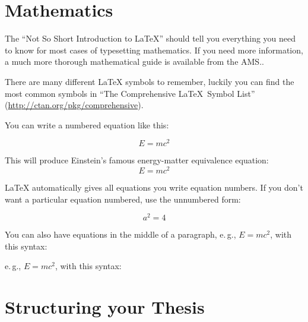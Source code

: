 \section{Mathematics}

The \enquote{Not So Short Introduction to LaTeX} should tell you everything you need to know for most cases of typesetting mathematics. If you need more information, a much more thorough mathematical guide is available from the AMS..

There are many different LaTeX symbols to remember, luckily you can find the most common symbols in ``The Comprehensive \LaTeX~Symbol List'' (\url{http://ctan.org/pkg/comprehensive}).

You can write a numbered equation like this:
\begin{latex}
\begin{equation}
E = mc^{2}
\label{eqn:Einstein}
\end{equation}
\end{latex}

This will produce Einstein's famous energy-matter equivalence equation:
\begin{equation}
E = mc^{2}
\label{eqn:Einstein}
\end{equation}

LaTeX automatically gives all equations you write equation numbers. If you don't want a particular equation numbered, use the unnumbered form:
\begin{latex}
\[ a^{2}=4 \]
\end{latex}

You can also have equations in the middle of a paragraph, e.\,g., \( E = mc^{2} \), with this syntax: 

\begin{latex}
e.\,g., \( E = mc^{2} \), with this syntax:
\end{latex}


\section{Structuring your Thesis}


